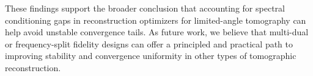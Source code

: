 \documentclass[journal, a4paper]{IEEEtran}
\begin{document}
These findings support the broader conclusion that accounting for spectral conditioning gaps in reconstruction optimizers for limited-angle tomography can help avoid unstable convergence tails. As future work, we believe that multi-dual or frequency-split fidelity designs can offer a principled and practical path to improving stability and convergence uniformity in other types of tomographic reconstruction.



\end{document}
